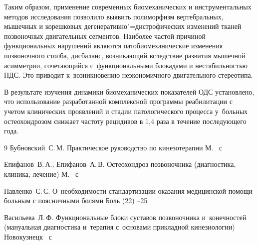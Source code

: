 Таким образом, применение современных биомеханических и инструментальных
методов исследования позволило выявить полиморфизм вертебральных, мышечных
и корешковых дегенеративно"=дистрофических изменений тканей позвоночных
двигательных сегментов. Наиболее частой причиной функциональных нарушений
являются патобиомеханические изменения позвоночного столба, дисбаланс,
возникающий вследствие развития мышечной асимметрии, сочетающийся с~функциональными блокадами и нестабильностью ПДС.
Это приводит к~возникновению неэкономичного двигательного стереотипа.

В результате изучения динамики биомеханических показателей ОДС установлено,
что использование разработанной комплексной программы реабилитации с учетом
клинических проявлений и стадии патологического процесса у~больных
остеохондрозом снижает частоту рецидивов в 1,4 раза в течение последующего
года.

\pagebreak

\begin{thebibliography}{9}
\by Бубновский~С.\,М.
\book Практическое руководство по кинезотерапии
\publaddr М.
~с

\by Епифанов~В.\,А., Епифанов~А.\,В.
\book Остеохондроз позвоночника (диагностика, клиника, лечение)
\publaddr М.
~с

\by Павленко~С.\,С.
\paper О~необходимости стандартизации оказания медицинской помощи больным с поясничными болями
\jour Боль
(22)
--25

\by Васильева~Л.\,Ф.
\book Функциональные блоки суставов позвоночника и~конечностей (мануальная диагностика и~терапия с~основами прикладной кинезиологии)
\publaddr Новокузнецк
~с

\end{thebibliography}

\makeengtitlem

% 
